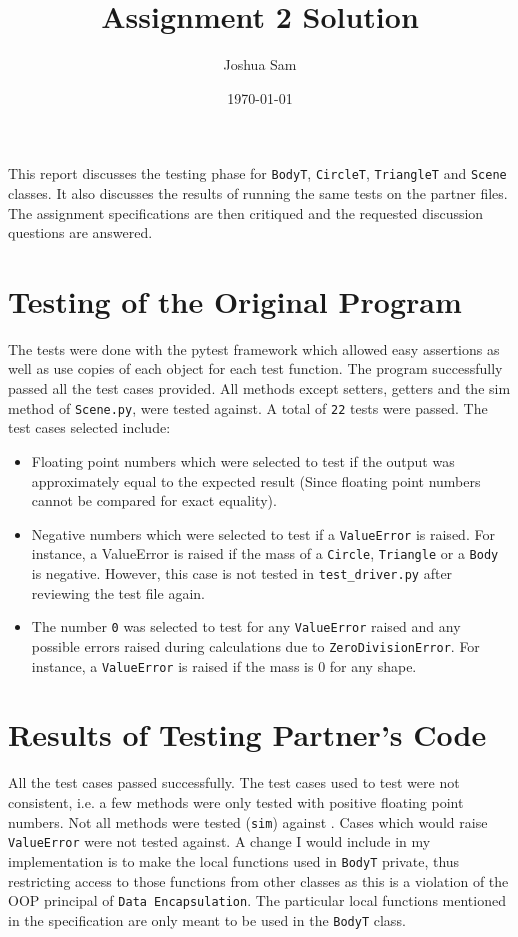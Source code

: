 \documentclass[12pt]{article}
\title{Assignment 2 Solution}
\author{Joshua Sam}
\date{\today}
\begin{document}
\maketitle

This report discusses the testing phase for \verb|BodyT|, \verb|CircleT|, \verb|TriangleT| and \verb|Scene| classes.  It also discusses the results
of running the same tests on the partner files. The assignment specifications
are then critiqued and the requested discussion questions are answered.

\section{Testing of the Original Program}

The tests were done with the pytest framework which allowed easy assertions as well as use copies of each object for each test function.
The program successfully passed all the test cases provided. All methods except setters, getters and the sim method of \verb|Scene.py|,  were tested against.
A total of \verb|22| tests were passed. The test cases selected include:
\begin{itemize}
\item Floating point numbers which were selected to test if the output was approximately equal to the expected result (Since floating point numbers cannot
 be compared for exact equality).
\item Negative numbers which were selected to test if a \verb|ValueError| is raised. For instance, a ValueError is 
raised if the mass of a \verb|Circle|, \verb|Triangle| or a \verb|Body| is negative. However, this case is not tested in \verb|test_driver.py| after reviewing the test file again.
\item The number \verb|0| was selected to test for any \verb|ValueError| raised and any possible errors raised during calculations due to \verb|ZeroDivisionError|. For instance, 
a \verb|ValueError| is raised if the mass is 0 for any shape.
\end{itemize}

\section{Results of Testing Partner's Code}

All the test cases passed successfully. The test cases used to test were not consistent, i.e. a few methods were only tested with positive floating point numbers. Not all methods
were tested (\verb|sim|) against . Cases which would raise \verb|ValueError| were not tested against. A change I would include in my implementation is to make the local functions used in \verb|BodyT| private, thus restricting access to those functions from other classes as this is a violation of the OOP principal of \verb|Data Encapsulation|. The particular local functions mentioned in the specification are only meant to be used in the \verb|BodyT| class. 
\end{document}
